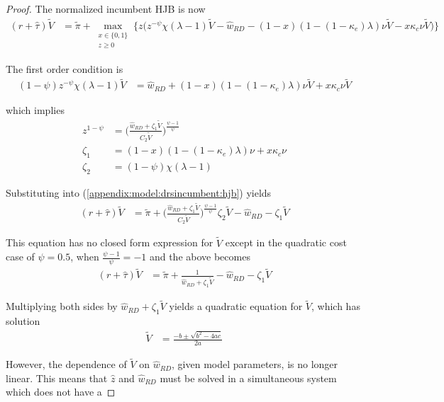 \documentclass[11pt,english]{article}
\begin{document}
\begin{proof}
	The normalized incumbent HJB is now
	\begin{align}
	(r + \hat{\tau}) \tilde{V} &= \tilde{\pi} + \max_{\substack{x \in \{0,1\} \\ z \ge 0}} \Big\{  z \Big( z^{-\psi} \chi (\lambda - 1) \tilde{V} - \hat{w}_{RD} - (1-x)(1 - (1-\kappa_e) \lambda)\nu \tilde{V} - x \kappa_c \nu \tilde{V}  \Big)   \Big\} \label{appendix:model:drsincumbent:hjb}
	\end{align} 
	
	The first order condition is
	\begin{align}
	(1-\psi) z^{-\psi} \chi (\lambda -1)\tilde{V} &= \hat{w}_{RD} + (1-x) (1-(1-\kappa_e)\lambda)\nu \tilde{V} + x \kappa_c \nu \tilde{V}
	\end{align}
	
	which implies
	\begin{align}
	z^{1-\psi} &= \Big( \frac{\hat{w}_{RD} + \zeta_1\tilde{V}}{C_2\tilde{V}} \Big)^{\frac{\psi -1}{\psi}} \\
	\zeta_1 &= (1-x)(1-(1-\kappa_e)\lambda)\nu + x\kappa_c\nu \\
	\zeta_2 &= (1-\psi) \chi (\lambda-1)
	\end{align}
	
	Substituting into (\ref{appendix:model:drsincumbent:hjb}) yields
	\begin{align}
	(r + \hat{\tau}) \tilde{V} &= \tilde{\pi} + \Big( \frac{\hat{w}_{RD} + \zeta_1\tilde{V}}{C_2\tilde{V}} \Big)^{\frac{\psi -1}{\psi}} \zeta_2 \tilde{V} - \hat{w}_{RD} - \zeta_1 \tilde{V} 
	\end{align}
	
	This equation has no closed form expression for $\tilde{V}$ except in the quadratic cost case of $\psi = 0.5$, when $\frac{\psi - 1}{\psi} = -1$ and the above becomes
	\begin{align}
	(r + \hat{\tau}) \tilde{V} &= \tilde{\pi} +  \frac{1}{\hat{w}_{RD} + \zeta_1\tilde{V}} - \hat{w}_{RD} - \zeta_1 \tilde{V} 
	\end{align}
	
	Multiplying both sides by $\hat{w}_{RD} + \zeta_1 \tilde{V}$ yields a quadratic equation for $\tilde{V}$, which has solution
	\begin{align}
		\tilde{V} &= \frac{-b \pm \sqrt{b^2 - 4ac}}{2a}
	\end{align}
	
	However, the dependence of $\tilde{V}$ on $\hat{w}_{RD}$, given model parameters, is no longer linear. This means that $\hat{z}$ and $\hat{w}_{RD}$ must be solved in a simultaneous system which does not have a 
	
\end{proof}
\end{document}
